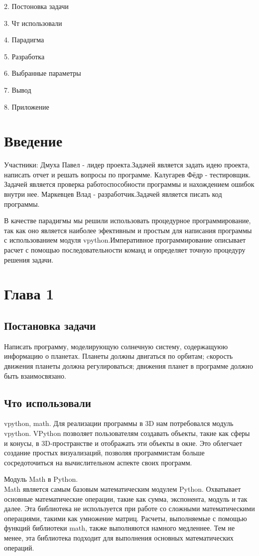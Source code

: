 \documentclass[12pt,a4paper]{extarticle}
\begin{document}
2. Постоновка задачи

3. Чт использовали

4. Парадигма

5. Разработка

6. Выбранные параметры

7. Вывод

8. Приложение
\section*{Введение}
Участники: Дмуха Павел - лидер проекта.Задачей является задать идею проекта, написать отчет и решать вопросы по программе. Калугарев Фёдр - тестировщик. Задачей является проверка работоспособности программы и нахождением ошибок внутри нее. Маркевцев Влад - разработчик.Задачей является писать код программы.

В качестве парадигмы мы решили использовать процедурное программирование, так как оно является наиболее эфективным и простым для написания программы с использованием модуля vpython.Императивное
программирование описывает расчет с помощью последовательности команд и определяет
точную процедуру решения задачи.
\section{Глава 1}
\subsection{Постановка задачи}
Написать программу, моделирующую солнечную систему, содержащуюю информацию о планетах. Планеты должны двигаться по орбитам; cкорость движения планеты должна регулироваться; движения планет в программе должно быть взаимосвязано.
\subsection{Что использовали}
 vpython, math. Для реализации программы в 3D нам потребовался модуль vpython. VPython позволяет пользователям создавать объекты, такие как сферы и конусы, в 3D-пространстве и отображать эти объекты в окне. Это облегчает создание простых визуализаций, позволяя программистам больше сосредоточиться на вычислительном аспекте своих программ.

Модуль Math в Python.\\
Math является самым базовым математическим модулем Python. Охватывает основные математические операции, такие как сумма, экспонента, модуль и так далее. Эта библиотека не используется при работе со сложными математическими операциями, такими как умножение матриц. Расчеты, выполняемые с помощью функций библиотеки math, также выполняются намного медленнее. Тем не менее, эта библиотека подходит для выполнения основных математических операций.
\end{document}
